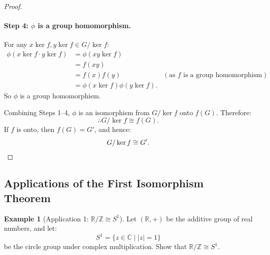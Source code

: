 \documentclass[12pt]{article}
\theoremstyle{definition}
\newtheorem{example}[definition]{Example}
\theoremstyle{plain}
\begin{document}
\begin{proof}
\paragraph{Step 4: $\phi$ is a group homomorphism.}
For any $x\ker f, y\ker f \in G/\ker f$:
\begin{align*}
\phi(x\ker f \cdot y\ker f) &= \phi(xy\ker f) \\
&= f(xy) \\
&= f(x) f(y) & (\text{as } f \text{ is a group homomorphism}) \\
&= \phi(x\ker f) \phi(y\ker f).
\end{align*}
So $\phi$ is a group homomorphism.

\bigskip
Combining Steps 1--4, $\phi$ is an isomorphism from $G/\ker f$ onto $f(G)$.
Therefore:
\[
\therefore G/\ker f \cong f(G).
\]
If $f$ is onto, then $f(G) = G'$, and hence:
\[
G/\ker f \cong G'. \qedhere
\]
\end{proof}

\subsection{Applications of the First Isomorphism Theorem}

\begin{example}[Application 1: $\mathbb{R}/\mathbb{Z} \cong S^1$]
Let $(\mathbb{R}, +)$ be the additive group of real numbers, and let:
\[
S^1 = \{ z \in \mathbb{C} \mid |z| = 1 \}
\]
be the circle group under complex multiplication. Show that $\mathbb{R}/\mathbb{Z} \cong S^1$.
\end{example}
\end{document}
